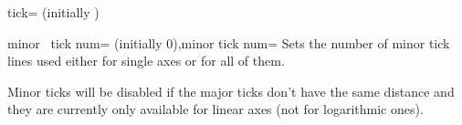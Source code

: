 \begin{pgfplotsxykey}{\x tick= (initially \marg{})}
\begin{codeexample}[]
\end{codeexample}
\end{pgfplotsxykey}

\begin{pgfplotsxykeylist}{minor \x\ tick num= (initially 0),minor tick num=}
	Sets the number of minor tick lines used either for single axes or for all of them.

	Minor ticks will be disabled if the major ticks don't have the same distance and they are currently only available for linear axes (not for logarithmic ones).

\begin{codeexample}[]
\end{codeexample}

\begin{codeexample}[]
\end{codeexample}

\begin{codeexample}[]
\end{codeexample}

\end{pgfplotsxykeylist}

